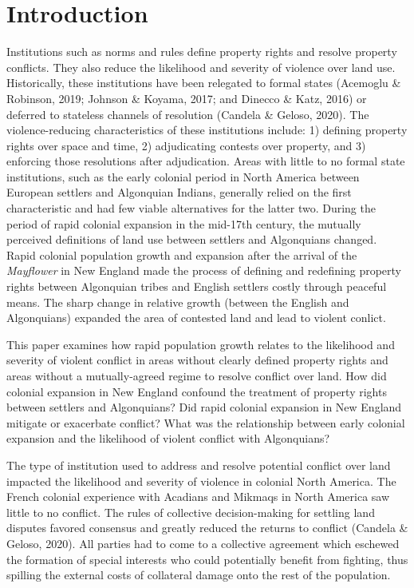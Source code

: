 \documentclass[11pt]{article}
\begin{document}
\section{Introduction}

Institutions such as norms and rules define property rights and resolve property conflicts. They also reduce the likelihood and severity of violence over land use. Historically, these institutions have been relegated to formal states %
(Acemoglu \& Robinson, 2019; Johnson \& Koyama, 2017; and Dinecco \& Katz, 2016) or deferred to stateless channels of resolution (Candela \& Geloso, 2020). The violence-reducing characteristics of these institutions include: 1) defining property rights over space and time, 2) adjudicating contests over property, and 3) enforcing those resolutions after adjudication. Areas with little to no formal state institutions, such as the early colonial period in North America between European settlers and Algonquian Indians, generally relied on the first characteristic and had few viable alternatives for the latter two. During the period of rapid colonial expansion in the mid-17th century, the mutually perceived definitions of land use between settlers and Algonquians changed. Rapid colonial population growth and expansion after the arrival of the {\em Mayflower} in New England made the process of defining and redefining property rights between Algonquian tribes and English settlers costly through peaceful means. The sharp change in relative growth (between the English and Algonquians) expanded the area of contested land and lead to violent conlict.

This paper examines how rapid population growth relates to the likelihood and severity of violent conflict in areas without clearly defined property rights and areas without a mutually-agreed regime to resolve conflict over land. How did colonial expansion in New England confound the treatment of property rights between settlers and Algonquians?  Did rapid colonial expansion in New England mitigate or exacerbate conflict?  What was the relationship between early colonial expansion and the likelihood of violent conflict with Algonquians?

The type of institution used to address and resolve potential conflict over land impacted the likelihood and severity of violence in colonial North America. The French colonial experience with Acadians and Mikmaqs in North America saw little to no conflict. The rules of collective decision-making for settling land disputes favored consensus and greatly reduced the returns to conflict (Candela \& Geloso, 2020). All parties had to come to a collective agreement which eschewed the formation of special interests who could potentially benefit from fighting, thus spilling the external costs of collateral damage onto the rest of the population. 
\end{document}
